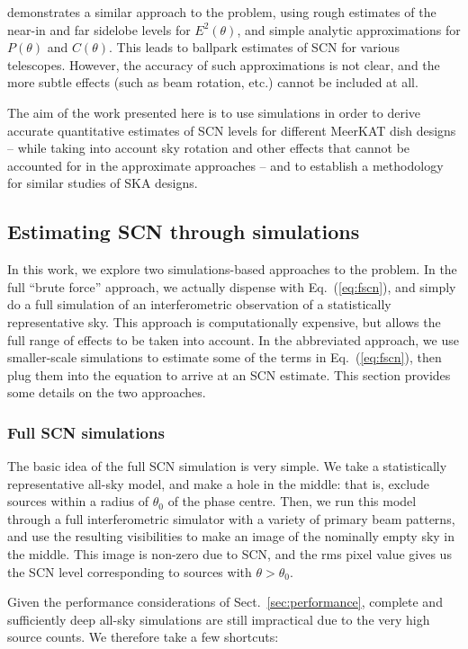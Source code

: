 \documentclass{aa}
\begin{document}
\citet{Braun:DR} demonstrates a similar approach to the problem, using rough estimates of the near-in and far sidelobe levels for $E^2(\theta)$, and simple analytic approximations for $P(\theta)$ and $C(\theta)$. This leads to ballpark estimates of SCN for various telescopes. However, the accuracy of such approximations is not clear, and the more subtle effects (such as beam rotation, etc.) cannot be included at all.

The aim of the work presented here is to use simulations in order to derive accurate quantitative estimates of SCN levels for different MeerKAT dish designs -- while taking into account sky rotation and other effects that cannot be accounted for in the approximate approaches -- and to establish a methodology for similar studies of SKA designs.

\subsection{Estimating SCN through simulations}

In this work, we explore two simulations-based approaches to the problem. In the full ``brute force'' approach, we actually dispense with Eq.~(\ref{eq:fscn}), and simply do a full simulation of an interferometric observation of a statistically representative sky. This approach is computationally expensive, but allows the full range of effects to be taken into account. In the abbreviated approach, we use smaller-scale simulations to estimate some of the terms in Eq.~(\ref{eq:fscn}), then plug them into the equation to arrive at an SCN estimate. This section provides some details on the two approaches.

\subsubsection{Full SCN simulations}

The basic idea of the full SCN simulation is very simple. We take a statistically representative all-sky model, and make a hole in the middle: that is, exclude sources within a radius of $\theta_0$ of the phase centre. Then, we run this model through a full interferometric simulator with a variety of primary beam patterns, and use the resulting visibilities to make an image of the nominally empty sky in the middle. This image is non-zero due to SCN, and the rms pixel value gives us the SCN level corresponding to sources with $\theta>\theta_0$.

Given the performance considerations of Sect.~\ref{sec:performance}, complete and sufficiently deep all-sky simulations are still impractical due to the very high source counts. We therefore take a few shortcuts:
\end{document}
